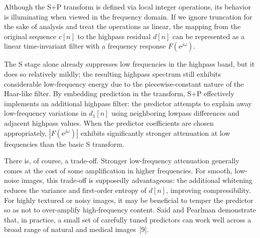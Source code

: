 Although the S+P transform is defined via local integer operations, its behavior is illuminating when viewed in the frequency domain. If we ignore truncation for the sake of analysis and treat the operations as linear, the mapping from the original sequence $c[n]$ to the highpass residual $d[n]$ can be represented as a linear time-invariant filter with a frequency response $F(\mathrm{e}^{j\omega})$.

The S stage alone already suppresses low frequencies in the highpass band, but it does so relatively mildly; the resulting highpass spectrum still exhibits considerable low-frequency energy due to the piecewise-constant nature of the Haar-like filter. By embedding prediction in the transform, S+P effectively implements an additional highpass filter: the predictor attempts to explain away low-frequency variations in $d_1[n]$ using neighboring lowpass differences and adjacent highpass values. When the predictor coefficients are chosen appropriately, $|F(\mathrm{e}^{j\omega})|$ exhibits significantly stronger attenuation at low frequencies than the basic S transform.

There is, of course, a trade-off. Stronger low-frequency attenuation generally comes at the cost of some amplification in higher frequencies. For smooth, low-noise images, this trade-off is supposedly advantageous: the additional whitening reduces the variance and first-order entropy of $d[n]$, improving compressibility. For highly textured or noisy images, it may be beneficial to temper the predictor so as not to over-amplify high-frequency content. Said and Pearlman demonstrate that, in practice, a small set of carefully tuned predictors can work well across a broad range of natural and medical images~[9]. 